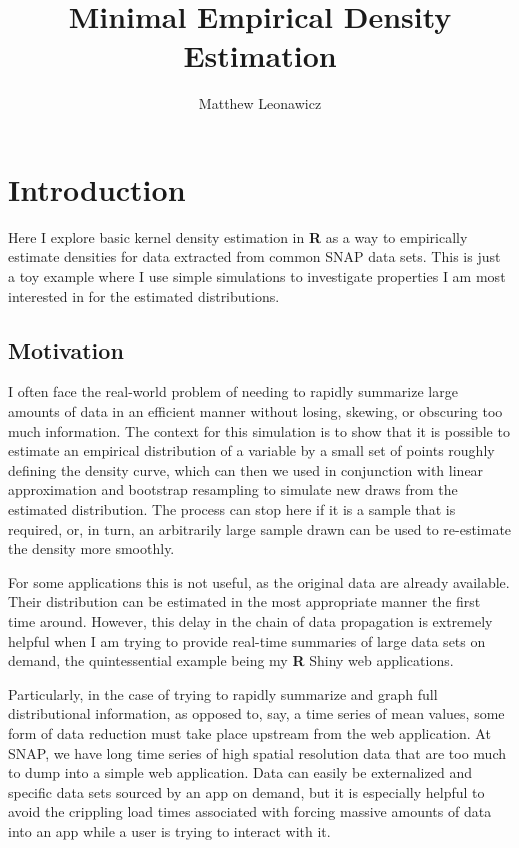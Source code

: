 \documentclass{article}\usepackage[]{graphicx}\usepackage[]{color}
\begin{document}
\title{Minimal Empirical Density Estimation}
\author{Matthew Leonawicz}
\maketitle





\section{Introduction}
Here I explore basic kernel density estimation in \textbf{R} as a way to empirically estimate densities for data extracted from common SNAP data sets.
This is just a toy example where I use simple simulations to investigate properties I am most interested in for the estimated distributions.

\subsection{Motivation}
I often face the real-world problem of needing to rapidly summarize large amounts of data in an efficient manner without losing, skewing, or obscuring too much information.
The context for this simulation is to show that it is possible to estimate an empirical distribution of a variable by a small set of points roughly defining the density curve,
which can then we used in conjunction with linear approximation and bootstrap resampling to simulate new draws from the estimated distribution.
The process can stop here if it is a sample that is required, or, in turn, an arbitrarily large sample drawn can be used to re-estimate the density more smoothly.

For some applications this is not useful, as the original data are already available.
Their distribution can be estimated in the most appropriate manner the first time around.
However, this delay in the chain of data propagation is extremely helpful when I am trying to provide real-time summaries of large data sets on demand,
the quintessential example being my \textbf{R} Shiny web applications.

Particularly, in the case of trying to rapidly summarize and graph full distributional information, as opposed to, say, a time series of mean values,
some form of data reduction must take place upstream from the web application.
At SNAP, we have long time series of high spatial resolution data that are too much to dump into a simple web application.
Data can easily be externalized and specific data sets sourced by an app on demand,
but it is especially helpful to avoid the crippling load times associated with forcing massive amounts of data into an app while a user is trying to interact with it.
\end{document}

